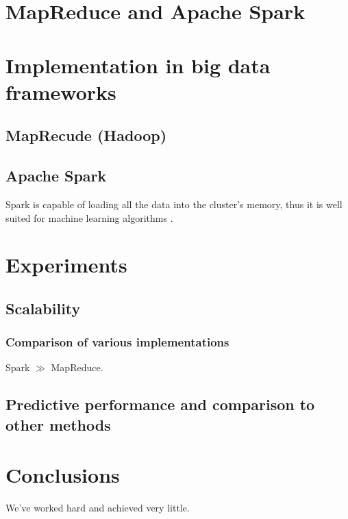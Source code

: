 \documentclass[12pt]{pracamgr}
\begin{document}
\chapter{MapReduce and Apache Spark}
\label{chap:mapredspark}
  
  
\chapter{Implementation in big data frameworks}
\label{chap:implattlsel}

\section{MapRecude (Hadoop)}

\section{Apache Spark}

Spark is capable of loading all the data into the cluster's memory, thus it is well suited for machine learning algorithms \cite{zaharia}.


\chapter{Experiments}
\label{chap:experiments}

\section{Scalability}
\subsection{Comparison of various implementations}

Spark $\gg$ MapReduce.

\section{Predictive performance and comparison to other methods}

\chapter{Conclusions}

We've worked hard and achieved very little.
\end{document}
